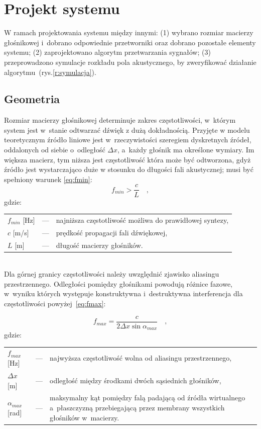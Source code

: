 \documentclass[10pt, a4paper]{article}
\let\Oldsection\section
\renewcommand{\section}{\FloatBarrier\Oldsection}
\let\Oldsubsection\subsection
\renewcommand{\subsection}{\FloatBarrier\Oldsubsection}
\begin{document}
\section{Projekt systemu}

W ramach projektowania systemu między innymi: (1) wybrano rozmiar macierzy
głośnikowej i~dobrano odpowiednie przetworniki oraz dobrano pozostałe elementy
systemu; (2) zaprojektowano algorytm przetwarzania sygnałów; (3) przeprowadzono
symulacje rozkładu pola akustycznego, by zweryfikować działanie algorytmu~(rys.\ref{r:symulacja}).

\subsection{Geometria}

Rozmiar macierzy głośnikowej determinuje zakres częstotliwości, w~którym system
jest w~stanie odtwarzać dźwięk z dużą dokładnością. Przyjęte w modelu teoretycznym 
źródło liniowe jest w~rzeczywistości szeregiem dyskretnych źródeł, oddalonych od siebie 
o~odległość $\Delta x$, a~każdy głośnik ma określone wymiary. Im większa macierz, tym niższa 
jest częstotliwość która może być odtworzona, gdyż źródło jest wystarczająco duże w stosunku 
do długości fali akustycznej; musi być spełniony warunek \eqref{eq:fmin}:
\begin{equation}
  f_{min}>\frac{c}{L} \quad,	\label{eq:fmin}
\end{equation}
gdzie:\\
\indent \begin{tabular}{l c l}
  $f_{min}$ [\si{\hertz}] & --- & najniższa częstotliwość możliwa do prawidłowej syntezy, \\
  $c$ [\si[per-mode=symbol]{\metre\per\second}] & --- & prędkość propagacji fali dźwiękowej, \\
  $L$ [\si{\metre}] & --- & długość macierzy głośników. \\
\end{tabular}\\

Dla górnej granicy częstotliwości należy uwzględnić zjawisko aliasingu
przestrzennego. Odległości pomiędzy głośnikami powodują różnice fazowe, w~wyniku których 
występuje konstruktywna i~destruktywna interferencja dla częstotliwości powyżej~\eqref{eq:fmax}:

\begin{equation}
  f_{max}=\frac{c}{2\Delta x \sin{\alpha_{max}}} \quad, \label{eq:fmax}
\end{equation}
gdzie:\\
\indent \begin{tabular}{l c p{}}
  $f_{max}$ [\si{\hertz}] & --- & najwyższa częstotliwość wolna od aliasingu przestrzennego, \\
  $\Delta x$ [\si{\metre}] & --- & odległość między środkami dwóch sąsiednich głośników, \\
  $\alpha_{max}$ [\si{\radian}] & --- & maksymalny kąt pomiędzy falą padającą od źródła 
wirtualnego a~płaszczyzną przebiegającą przez membrany wszystkich głośników w~macierzy.\\
\end{tabular}\\
\end{document}
